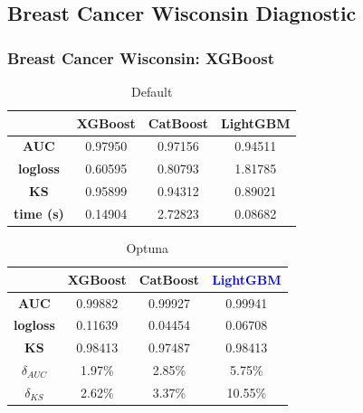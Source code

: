 \documentclass{beamer}
\begin{document}
\subsection{Breast Cancer Wisconsin Diagnostic}
\begin{frame}
\frametitle{Breast Cancer Wisconsin: XGBoost}
\begin{table}[H]
\centering
\begin{tabular}{|c|c|c|c|}
\hline
	& \textbf{XGBoost} &\textbf{CatBoost} & \textbf{LightGBM} \\
\hline
\textbf{AUC}	& 0.97950	&0.97156	&0.94511 \\
\hline
\textbf{logloss}	&0.60595	&0.80793&	1.81785 \\
\hline
\textbf{KS}	&0.95899	&0.94312	&0.89021 \\
\hline
\textbf{time (s)}	&0.14904	&2.72823	&0.08682 \\
\hline
\end{tabular}
\caption{Default}\label{res:dia:1}
\end{table}
\begin{table}[H]
\centering
\begin{tabular}{|c|c|c|c|}
\hline
	& \textbf{XGBoost} &\textbf{CatBoost} & \textcolor{blue}{\textbf{LightGBM}} \\
\hline
\textbf{AUC}	& 0.99882 &	0.99927 &0.99941 \\
\hline
\textbf{logloss}	& 0.11639	&0.04454 &	0.06708 \\
\hline
\textbf{KS}	&0.98413	&0.97487 &	0.98413 \\
\hline
$\delta_{AUC}$	& 1.97\%&	2.85\%	   &     5.75\% \\
\hline
$\delta_{KS}$	& 2.62\%    	&  3.37\% &	10.55\%\\
\hline
\end{tabular}
\caption{Optuna}\label{res:dia:op}
\end{table}
\end{frame}


\end{document}
